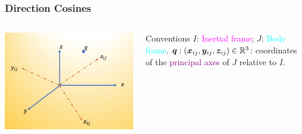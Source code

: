 \begin{frame}
	\frametitle{Direction Cosines}
	\begin{columns}[]
		\begin{column}{.6\linewidth}
			\centering
			\includegraphics[width=\textwidth]{../Notes/figures/rotation_illus.jpg}
		\end{column}
		\begin{column}{.4\linewidth}
			\begin{block}{Conventions}
			 $I$: \textcolor{magenta}{Inertial frame}; $J$: \textcolor{cyan}{Body frame}.
			$\bm{q}: (\bm{x}_{ij}, \bm{y}_{ij},\bm{z}_{ij}) \in \mathbb{R}^3$: coordinates of the \textcolor{purple}{principal axes} of $J$ relative to $I$.
			\end{block}
		\end{column}
	\end{columns}
\end{frame}


